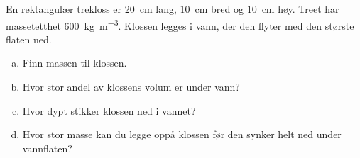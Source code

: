 %
En rektangulær trekloss er \SI{20}{\centi\metre} lang, \SI{10}{\centi\metre} bred og \SI{10}{\centi\metre} høy. Treet har massetetthet \SI{600}{\kilo\gram\per\metre\cubed}. Klossen legges i vann, der den flyter med den største flaten ned.
\begin{enumerate}[a)]
    \item Finn massen til klossen.
    \item Hvor stor andel av klossens volum er under vann?
    \item Hvor dypt stikker klossen ned i vannet?
    \item Hvor stor masse kan du legge oppå klossen før den synker helt ned under vannflaten?
\end{enumerate}
%
